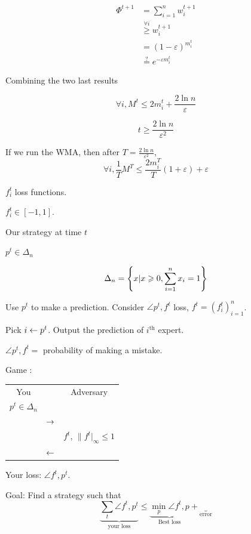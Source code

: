 \[
    \begin{aligned}
        \Phi^{t+1} &= \sum\limits_{i=1}^n w_i^{t+1}\\
        &\overset{\forall i}{\geqslant} w_i^{t+1}\\
        &=(1-\varepsilon)^{m_i^t}\\
        &\overset{?}{=} e^{-\varepsilon m_i^t}
    \end{aligned}
\]

Combining the two last results

\[
    \boxed{\forall i, M^t \leqslant 2 m_i^t + \frac{2\ln n}{\varepsilon}}
\]

\[
    \boxed{t \geqslant \frac{2\ln n}{\varepsilon^2}}
\]

\begin{theorem}
    If we run the WMA, then after $T= \frac{2\ln n}{\varepsilon^2}$,
    \[
        \forall i, \frac{1}{T} M^T \leqslant \frac{2m_i^T}{T} \left( 1+\varepsilon\right) + \varepsilon
    \]
\end{theorem}

$f_i^t$ loss functions.

$f_i^t \in [-1,1]$.

Our strategy at time $t$

$p^t \in \Delta_n$

\[
    \Delta_n = \left\{ x \vert x \geqslant 0, \sum\limits_{i=1}^n x_i = 1 \right\}
\]

Use $p^t$ to make a prediction. Consider $\angle{p^t, f^t}$ loss, $f^t = (f_i^t)^n_{i=1}$.

Pick $i \leftarrow p^t$. Output the prediction of $i^\text{th}$  expert.

$\angle{p^t, f^t} = $ probability of making a mistake.

Game : 
\begin{tabular}{ccc}
    You & & Adversary\\
    $p^t \in \Delta_n$ & & \\
    & $\rightarrow$ & \\
    & & $f^t$, $\lVert f^t \rvert_\infty \leqslant 1$\\
    & $\leftarrow$ & \\
\end{tabular}

Your loss: $\angle{f^t, p^t}$.

Goal: Find a strategy such that 
\[
    \underbrace{\sum\limits_t \angle{f^t, p^t}}_{\text{your loss}} \leqslant \underbrace{\min_p \angle{f^t, p}}_{\text{Best loss}} + \underbrace{}_{\text{error}}
\]

